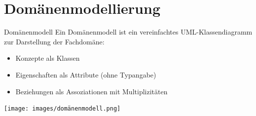 \section{Domänenmodellierung}

\begin{definition}{Domänenmodell}
Ein Domänenmodell ist ein vereinfachtes UML-Klassendiagramm zur Darstellung der Fachdomäne:
\begin{itemize}
    \item Konzepte als Klassen
    \item Eigenschaften als Attribute (ohne Typangabe)
    \item Beziehungen als Assoziationen mit Multiplizitäten
\end{itemize}
\texttt{[image: images/domänenmodell.png]}
\end{definition}

